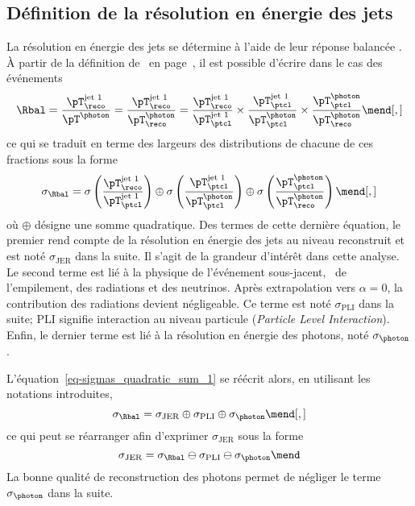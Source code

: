 \subsection{Définition de la résolution en énergie des jets}\label{chapter-JERC-section-JER-subsec-JER_definition}
La résolution en énergie des jets se détermine à l'aide de leur réponse balancée \Rbal.
À partir de la définition de \Rbal\ en page~\pageref{eq-chapter-JERC-section-CMS-subsec-residuals-Rbal_def}, il est possible d'écrire dans le cas des événements \Gjets
\begin{equation}
\Rbal
= \frac{\pT_\reco^\text{jet 1}}{\pT^{\photon}}
= \frac{\pT_\reco^\text{jet 1}}{\pT^{\photon}_\reco}
=
\frac{\pT_\reco^\text{jet 1}}{\pT^\text{jet 1}_\ptcl}
\times
\frac{\pT^\text{jet 1}_\ptcl}{\pT^{\photon}_\ptcl}
\times
\frac{\pT^{\photon}_\ptcl}{\pT^{\photon}_\reco}
\mend[,]
\end{equation}
ce qui se traduit en terme des largeurs des distributions de chacune de ces fractions sous la forme
\begin{equation}
\sigma_{\Rbal}
=
\sigma\left(\frac{\pT_\reco^\text{jet 1}}{\pT^\text{jet 1}_\ptcl}\right)
\oplus
\sigma\left(\frac{\pT^\text{jet 1}_\ptcl}{\pT^{\photon}_\ptcl}\right)
\oplus
\sigma\left(\frac{\pT^{\photon}_\ptcl}{\pT^{\photon}_\reco} \vphantom{\frac{\pT^\text{jet 1}_\ptcl}{\pT^{\photon}_\ptcl}}\right)
\label{eq-sigmas_quadratic_sum_1}
\mend[,]
\end{equation}
où $\oplus$ désigne une somme quadratique.
Des termes de cette dernière équation, le premier rend compte de la résolution en énergie des jets au niveau reconstruit et est noté $\sigma_\text{JER}$ dans la suite.
Il s'agit de la grandeur d'intérêt dans cette analyse.
Le second terme est lié à la physique de l'événement sous-jacent, \ie\ de l'empilement, des radiations et des neutrinos.
Après extrapolation vers $\alpha=0$, la contribution des radiations devient négligeable.
Ce terme est noté $\sigma_\text{PLI}$ dans la suite; \og PLI \fg{} signifie interaction au niveau particule (\emph{Particle Level Interaction}).
Enfin, le dernier terme est lié à la résolution en énergie des photons, noté $\sigma_{\photon}$.
\par L'équation~\eqref{eq-sigmas_quadratic_sum_1} se réécrit alors, en utilisant les notations introduites,
\begin{equation}
\sigma_{\Rbal}
=
\sigma_\text{JER}
\oplus
\sigma_\text{PLI}
\oplus
\sigma_{\photon}
\label{eq-sigmas_quadratic_sum_2}
\mend[,]
\end{equation}
ce qui peut se réarranger afin d'exprimer $\sigma_\text{JER}$ sous la forme
\begin{equation}
\sigma_\text{JER}
=
\sigma_{\Rbal}
\ominus
\sigma_\text{PLI}
\ominus
\sigma_{\photon}
\label{eq-sigmas_quadratic_sum_3}
\mend
\end{equation}
La bonne qualité de reconstruction des photons permet de négliger le terme $\sigma_{\photon}$ dans la suite.
